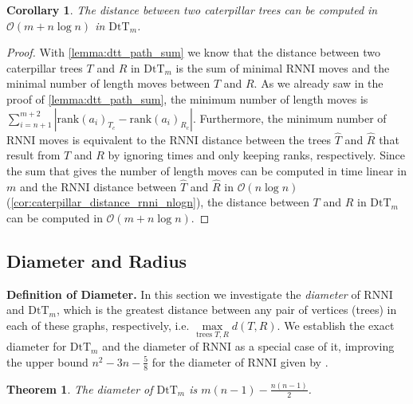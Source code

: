 \documentclass[11pt]{amsart}
\newtheorem{theorem}{Theorem}
\newtheorem{corollary}{Corollary}
\newcommand{\rnni}{\mathrm{RNNI}}
\newcommand{\rank}{\mathrm{rank}}
\newcommand{\dtt}{\mathrm{DtT}}
\renewcommand{\O}{\mathcal O}
\newcommand{\summary}[1]{\textbf{#1}} %
\begin{document}
\begin{corollary}
	The distance between two caterpillar trees can be computed in $\O(m + n \log n)$ in $\dtt_m$.
	\label{cor:caterpillar_distance_dtt_m_nlogn}
\end{corollary}

\begin{proof}
	With \autoref{lemma:dtt_path_sum} we know that the distance between two caterpillar trees $T$ and $R$ in $\dtt_m$ is the sum of minimal $\rnni$ moves and the minimal number of length moves between $T$ and $R$.
	As we already saw in the proof of \autoref{lemma:dtt_path_sum}, the minimum number of length moves is $\sum_{i = n+1}^{m+2} |\rank(a_{i})_{T_c} - \rank(a_{i})_{R_c}|$.
	Furthermore, the minimum number of $\rnni$ moves is equivalent to the $\rnni$ distance between the trees $\hat T$ and $\hat R$ that result from $T$ and $R$ by ignoring times and only keeping ranks, respectively.
	Since the sum that gives the number of length moves can be computed in time linear in $m$ and the $\rnni$ distance between $\hat T$ and $\hat R$ in $\O(n \log n)$ (\autoref{cor:caterpillar_distance_rnni_nlogn}), the distance between $T$ and $R$ in $\dtt_m$ can be computed in $\O(m + n \log n)$.
\end{proof}

\subsection{Diameter and Radius}

\summary{Definition of Diameter.}
In this section we  investigate the \emph{diameter} of $\rnni$ and $\dtt_m$, which is the greatest distance between any pair of vertices (trees) in each of these graphs, respectively, i.e. $\max\limits_{\text{trees }T,R}d(T,R)$.
We establish the exact diameter for $\dtt_m$ and the diameter of $\rnni$ as a special case of it, improving the upper bound $n^2 - 3n - \frac{5}{8}$ for the diameter of $\rnni$ given by \textcite{Gavryushkin2018-ol}.


\begin{theorem}
	The diameter of $\dtt_m$ is $m(n-1) - \frac{n(n-1)}{2}$.
	\label{thm:dtt_diameter}
\end{theorem}
\end{document}
